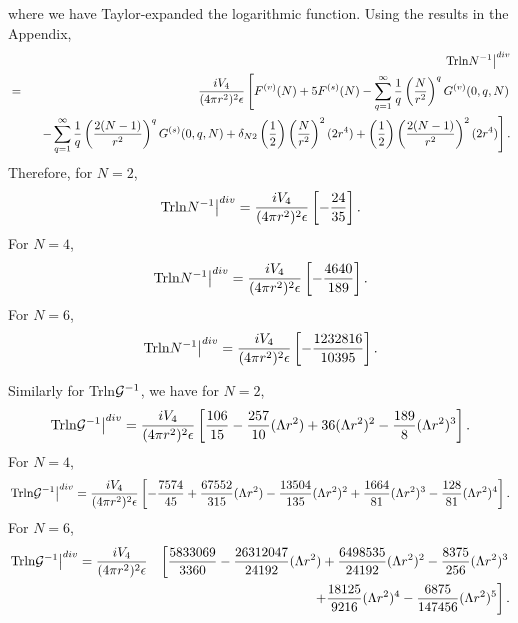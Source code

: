 \documentclass[a4paper,aps,preprint,groupedaddress,showpacs]{revtex4}
\begin{document}
where we have Taylor-expanded the logarithmic function. Using
the results in the Appendix,
\begin{eqnarray}
&&\left.{\rm Trln}N^{-1}\right\vert^{div}
\nonumber\\
&=&
\frac{iV_{4}}{(4\pi r^{2})^{2}\epsilon}
\left[F^{(v)}(N)+5F^{(s)}(N)-
\sum^{\infty}_{q=1}\frac{1}{q}
\left(\frac{N}{r^{2}}\right)^{q}G^{(v)}(0,q,N)\right.
\nonumber\\
&&\ \ \left.
-\sum^{\infty}_{q=1}\frac{1}{q}
\left(\frac{2(N-1)}{r^{2}}\right)^{q}G^{(s)}(0,q,N)
+\delta_{N2}\left(\frac{1}{2}\right)
\left(\frac{N}{r^{2}}\right)^{2}(2r^{4})+
\left(\frac{1}{2}\right)\left(\frac{2(N-1)}{r^{2}}\right)^{2}
(2r^{4})\right].
\nonumber\\
\end{eqnarray}
Therefore, for $N=2$,
\begin{equation}
\left.{\rm Trln}N^{-1}\right\vert^{div}=
\frac{iV_{4}}{(4\pi r^{2})^{2}\epsilon}\left[-\frac{24}{35}\right].
\end{equation}
For $N=4$,
\begin{equation}
\left.{\rm Trln}N^{-1}\right\vert^{div}=
\frac{iV_{4}}{(4\pi r^{2})^{2}\epsilon}\left[-\frac{4640}{189}\right].
\end{equation}
For $N=6$,
\begin{equation}
\left.{\rm Trln}N^{-1}\right\vert^{div}=
\frac{iV_{4}}{(4\pi r^{2})^{2}\epsilon}
\left[-\frac{1232816}{10395}\right].
\end{equation}

Similarly for Trln${\cal G}^{-1}$, we have for $N=2$,
\begin{equation}
\left.{\rm Trln}{\cal G}^{-1}\right\vert^{div}=
\frac{iV_{4}}{(4\pi r^{2})^{2}\epsilon}
\left[\frac{106}{15}-\frac{257}{10}(\Lambda r^{2})+
36(\Lambda r^{2})^{2}-\frac{189}{8}(\Lambda r^{2})^{3}\right].
\end{equation}
For $N=4$,
\begin{equation}
\left.{\rm Trln}{\cal G}^{-1}\right\vert^{div}=
\frac{iV_{4}}{(4\pi r^{2})^{2}\epsilon}
\left[-\frac{7574}{45}+\frac{67552}{315}(\Lambda r^{2})-
\frac{13504}{135}(\Lambda r^{2})^{2}+
\frac{1664}{81}(\Lambda r^{2})^{3}-
\frac{128}{81}(\Lambda r^{2})^{4}\right].
\end{equation}
For $N=6$,
\begin{eqnarray}
\left.{\rm Trln}{\cal G}^{-1}\right\vert^{div}=
\frac{iV_{4}}{(4\pi r^{2})^{2}\epsilon}
&&\left[\frac{5833069}{3360}-\frac{26312047}{24192}(\Lambda r^{2})+
\frac{6498535}{24192}(\Lambda r^{2})^{2}-
\frac{8375}{256}(\Lambda r^{2})^{3}\right.
\nonumber\\
&&\ \ \left.
+\frac{18125}{9216}(\Lambda r^{2})^{4}-
\frac{6875}{147456}(\Lambda r^{2})^{5}\right].
\end{eqnarray}
\end{document}
